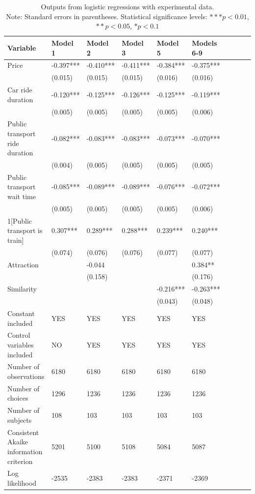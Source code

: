 \documentclass[a4paper,12pt]{article}
\begin{document}
\section{}\label{appendix:nejcDataRobustnessChecks}
\clearpage
\begin{table}
    \centering
    \scriptsize
    \begin{tabular}{p{5.3cm}*{9}{p{1.5cm}}}
    \toprule
    Variable & Model 1 & Model 2 & Model 3 & Model 5 & Models 6-9 \\
    \midrule
    Price & -0.397*** & -0.410*** & -0.411*** & -0.384*** & -0.375*** \\
     & (0.015) & (0.015) & (0.015) & (0.016) & (0.016) \\
    Car ride duration & -0.120*** & -0.125*** & -0.126*** & -0.125*** & -0.119*** \\
     & (0.005) & (0.005) & (0.005) & (0.005) & (0.006) \\
    Public transport ride duration & -0.082*** & -0.083*** & -0.083*** & -0.073*** & -0.070*** \\
     & (0.004) & (0.005) & (0.005) & (0.005) & (0.005) \\
    Public transport wait time & -0.085*** & -0.089*** & -0.089*** & -0.076*** & -0.072*** \\
     & (0.005) & (0.005) & (0.005) & (0.005) & (0.006) \\
    1[Public transport is train] & 0.307*** & 0.289*** & 0.288*** & 0.239*** & 0.240*** \\
     & (0.074) & (0.076) & (0.076) & (0.077) & (0.077) \\
    Attraction & & -0.044 & & & 0.384** \\
     & & (0.158) & & & (0.176) \\
    Similarity & & & & -0.216*** & -0.263*** \\
     & & & & (0.043) & (0.048) \\
    Constant included & YES & YES & YES & YES & YES \\
    Control variables included & NO & YES & YES & YES & YES \\
    Number of observations & 6180 & 6180 & 6180 & 6180 & 6180 \\
    Number of choices & 1296 & 1236 & 1236 & 1236 & 1236 \\
    Number of subjects & 108 & 103 & 103 & 103 & 103 \\
    Consistent Akaike information criterion & 5201 & 5100 & 5108 & 5084 & 5087 \\
    Log likelihood & -2535 & -2383 & -2383 & -2371 & -2369 \\
    \bottomrule
    \end{tabular}
    \caption{Outputs from logistic regressions with experimental data.\\ Note: Standard errors in parentheses. Statistical significance levels: $*** p<0.01$, $** p<0.05$, $* p<0.1$}
    \label{tab:logitExperimentalData}
\end{table}
\end{document}
